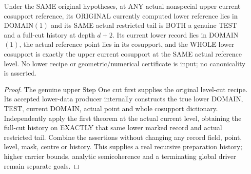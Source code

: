 \begin{theorem}
\label{hir:original-finite-cut-current-lower-full-history-data}
\leanok
Under the SAME original hypotheses, at ANY actual nonspecial upper current
cosupport reference, its ORIGINAL currently computed lower reference lies
in DOMAIN$(1)$ and its SAME actual restricted tail is BOTH a genuine TEST
and a full-cut history at depth $d+2$. Its current lower record lies in
DOMAIN$(1)$, the actual reference point lies in its cosupport, and the
WHOLE lower cosupport is exactly the upper current cosupport at the SAME
actual reference level. No lower recipe or geometric/numerical certificate
is input; no canonicality is asserted.
\end{theorem}
\begin{proof}
The genuine upper Step One cut first supplies the original level-cut
recipe. Its accepted lower-data producer internally constructs the true
lower DOMAIN, TEST, current DOMAIN, actual point and whole cosupport
dictionary. Independently apply the first theorem at the actual current
level, obtaining the full-cut history on EXACTLY that same lower marked
record and actual restricted tail. Combine the assertions without changing
any record field, point, level, mask, centre or history. This supplies a
real recursive preparation history; higher carrier bounds, analytic
semicoherence and a terminating global driver remain separate goals.
\end{proof}
